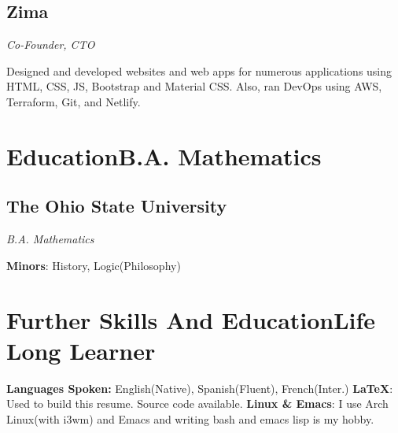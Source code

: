 \documentclass[letterpaper,11pt]{article}
\begin{document}
\subsection{Zima}
\textit{Co-Founder, CTO}
\vspace{2mm}
\begin{adjustwidth}{1cm}{1cm}
Designed and developed websites and web
apps for numerous applications using
HTML, CSS, JS, Bootstrap and Material CSS.
Also, ran DevOps using AWS, Terraform,
Git, and Netlify.
\end{adjustwidth}
\section{Education\hfill B.A. Mathematics}
\subsection{The Ohio State University}
\textit{B.A. Mathematics}
\vspace{2mm}
\begin{adjustwidth}{1cm}{1cm}
\textbf{Minors}: History, Logic(Philosophy)
\end{adjustwidth}
\section{Further Skills And Education\hfill Life Long Learner}
\textbf{Languages Spoken: } English(Native), Spanish(Fluent), French(Inter.)
\newline
\textbf{\LaTeX}: Used to build this resume. Source code available.
\newline
\textbf{Linux \& Emacs}: I use Arch Linux(with i3wm) and Emacs and writing bash and emacs lisp is my hobby.
\newline
\end{document}
